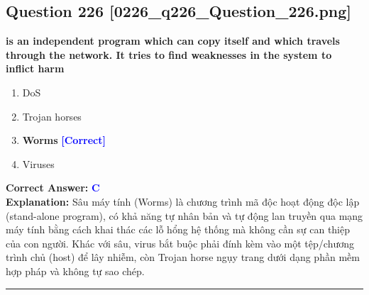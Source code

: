 \documentclass[11pt,a4paper]{article}
\begin{document}
\begin{minipage}{\textwidth}
\subsection*{Question 226 \quad \footnotesize{[0226\_q226\_Question\_226.png]}}
\noindent \textbf{is an independent program which can copy itself and which travels through the network. It tries to find weaknesses in the system to inflict harm}

\begin{enumerate}[label=\Alph*.]
    \item DoS
    \item Trojan horses
    \item \textbf{Worms} \hfill \textcolor{blue}{\textbf{[Correct]}}
    \item Viruses
\end{enumerate}

\noindent \textbf{Correct Answer:} \textcolor{blue}{\textbf{C}} \\[2pt]
\noindent \textbf{Explanation:} Sâu máy tính (Worms) là chương trình mã độc hoạt động độc lập (stand-alone program), có khả năng tự nhân bản và tự động lan truyền qua mạng máy tính bằng cách khai thác các lỗ hổng hệ thống mà không cần sự can thiệp của con người. Khác với sâu, virus bắt buộc phải đính kèm vào một tệp/chương trình chủ (host) để lây nhiễm, còn Trojan horse ngụy trang dưới dạng phần mềm hợp pháp và không tự sao chép.

\par\vspace{0.3cm}
\hrule
\vspace{0.3cm}
\end{minipage}
\end{document}
